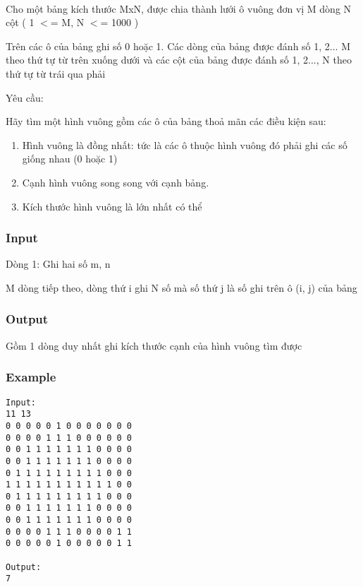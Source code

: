 

 

Cho một bảng kích thước MxN, được chia thành lưới ô vuông đơn vị M dòng N cột ( 1 $<$= M, N $<$= 1000 )

Trên các ô của bảng ghi số 0 hoặc 1. Các dòng của bảng được đánh số 1, 2... M theo thứ tự từ trên xuống dưới và các cột của bảng được đánh số 1, 2..., N theo thứ tự từ trái qua phải

Yêu cầu:

Hãy tìm một hình vuông gồm các ô của bảng thoả mãn các điều kiện sau:
\begin{enumerate}
	\item Hình vuông là đồng nhất: tức là các ô thuộc hình vuông đó phải ghi các số giống nhau (0 hoặc 1)
	\item Cạnh hình vuông song song với cạnh bảng.
	\item Kích thước hình vuông là lớn nhất có thể
\end{enumerate}

\subsubsection{Input}

Dòng 1: Ghi hai số m, n

M dòng tiếp theo, dòng thứ i ghi N số mà số thứ j là số ghi trên ô (i, j) của bảng

\subsubsection{Output}

Gồm 1 dòng duy nhất ghi kích thước cạnh của hình vuông tìm được

\subsubsection{Example}
\begin{verbatim}
Input:
11 13
0 0 0 0 0 1 0 0 0 0 0 0 0
0 0 0 0 1 1 1 0 0 0 0 0 0
0 0 1 1 1 1 1 1 1 0 0 0 0
0 0 1 1 1 1 1 1 1 0 0 0 0
0 1 1 1 1 1 1 1 1 1 0 0 0
1 1 1 1 1 1 1 1 1 1 1 0 0
0 1 1 1 1 1 1 1 1 1 0 0 0
0 0 1 1 1 1 1 1 1 0 0 0 0
0 0 1 1 1 1 1 1 1 0 0 0 0
0 0 0 0 1 1 1 0 0 0 0 1 1
0 0 0 0 0 1 0 0 0 0 0 1 1

Output:
7
\end{verbatim}